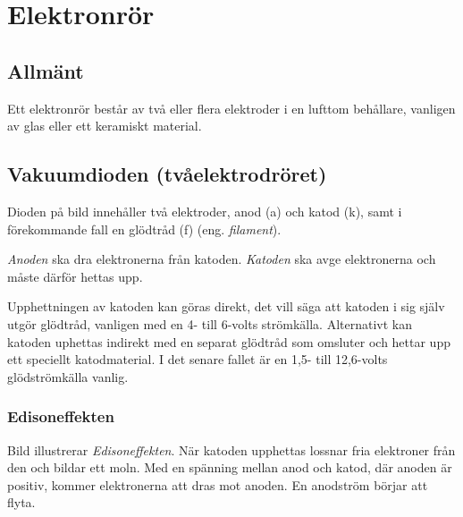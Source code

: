 \section{Elektronrör}
\label{elektronrör}

\subsection{Allmänt}

Ett elektronrör består av två eller flera elektroder i en lufttom behållare,
vanligen av glas eller ett keramiskt material.


\subsection{Vakuumdioden (tvåelektrodröret)}
\label{vakuumdioden}

Dioden på bild  innehåller två elektroder,
anod (a) och katod (k), samt i förekommande fall en glödtråd (f)
(eng. \emph{filament}).

\emph{Anoden} ska dra elektronerna från katoden.
\emph{Katoden} ska avge elektronerna och måste därför hettas upp.

Upphettningen av katoden kan göras direkt, det vill säga att katoden i sig
själv utgör glödtråd, vanligen med en 4- till 6-volts strömkälla.
Alternativt kan katoden uphettas indirekt med en separat glödtråd som omsluter
och hettar upp ett speciellt katodmaterial.
I det senare fallet är en 1,5- till 12,6-volts glödströmkälla vanlig.



\subsubsection{Edisoneffekten}

Bild  illustrerar \emph{Edisoneffekten}.
När katoden upphettas lossnar fria elektroner från den och bildar ett moln.
Med en spänning mellan anod och katod, där anoden är positiv, kommer
elektronerna att dras mot anoden.
En anodström börjar att flyta.

